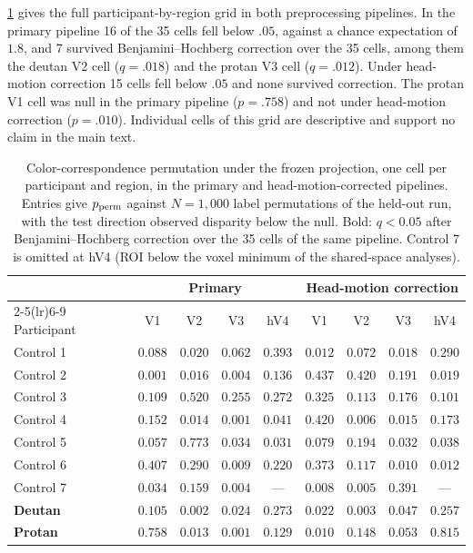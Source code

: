 \cref{tab:color_specificity} gives the full participant-by-region grid in both preprocessing pipelines. In the primary pipeline 16 of the 35 cells fell below $.05$, against a chance expectation of $1.8$, and 7 survived Benjamini--Hochberg correction over the 35 cells, among them the deutan V2 cell ($q = .018$) and the protan V3 cell ($q = .012$). Under head-motion correction 15 cells fell below $.05$ and none survived correction. The protan V1 cell was null in the primary pipeline ($p = .758$) and not under head-motion correction ($p = .010$). Individual cells of this grid are descriptive and support no claim in the main text.

\begin{table}[h]
\centering
\caption{Color-correspondence permutation under the frozen projection, one cell per participant and region, in the primary and head-motion-corrected pipelines. Entries give $p_{\rm perm}$ against $N = 1{,}000$ label permutations of the held-out run, with the test direction observed disparity below the null. Bold: $q < 0.05$ after Benjamini--Hochberg correction over the 35 cells of the same pipeline. Control 7 is omitted at hV4 (ROI below the voxel minimum of the shared-space analyses).}
\label{tab:color_specificity}
\begin{tabular}{lcccccccc}
\toprule
 & \multicolumn{4}{c}{Primary} & \multicolumn{4}{c}{Head-motion correction} \\
\cmidrule(lr){2-5}\cmidrule(lr){6-9}
Participant & V1 & V2 & V3 & hV4 & V1 & V2 & V3 & hV4 \\
\midrule
Control 1 & $0.088$ & $0.020$ & $0.062$ & $0.393$ & $0.012$ & $0.072$ & $0.018$ & $0.290$ \\
Control 2 & $\mathbf{0.001}$ & $0.016$ & $\mathbf{0.004}$ & $0.136$ & $0.437$ & $0.420$ & $0.191$ & $0.019$ \\
Control 3 & $0.109$ & $0.520$ & $0.255$ & $0.272$ & $0.325$ & $0.113$ & $0.176$ & $0.101$ \\
Control 4 & $0.152$ & $0.014$ & $\mathbf{0.001}$ & $0.041$ & $0.420$ & $0.006$ & $0.015$ & $0.173$ \\
Control 5 & $0.057$ & $0.773$ & $0.034$ & $0.031$ & $0.079$ & $0.194$ & $0.032$ & $0.038$ \\
Control 6 & $0.407$ & $0.290$ & $\mathbf{0.009}$ & $0.220$ & $0.373$ & $0.117$ & $0.010$ & $0.012$ \\
Control 7 & $0.034$ & $0.159$ & $\mathbf{0.004}$ & --- & $0.008$ & $0.005$ & $0.391$ & --- \\
\textbf{Deutan} & $0.105$ & $\mathbf{0.002}$ & $0.024$ & $0.273$ & $0.022$ & $0.003$ & $0.047$ & $0.257$ \\
\textbf{Protan} & $0.758$ & $0.013$ & $\mathbf{0.001}$ & $0.129$ & $0.010$ & $0.148$ & $0.053$ & $0.815$ \\
\bottomrule
\end{tabular}
\end{table}

